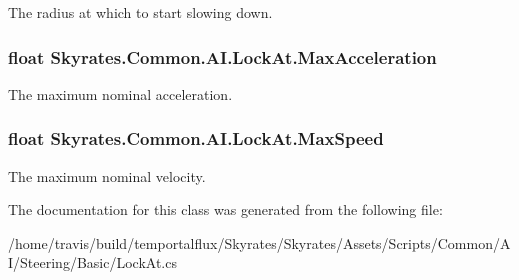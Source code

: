 The radius at which to start slowing down. 

\hypertarget{class_skyrates_1_1_common_1_1_a_i_1_1_lock_at_a9910cc8832b49ccb54957981785470be}{
\subsubsection[{Max\-Acceleration}]{\setlength{\rightskip}{0pt plus 5cm}float Skyrates.\-Common.\-A\-I.\-Lock\-At.\-Max\-Acceleration}}\label{class_skyrates_1_1_common_1_1_a_i_1_1_lock_at_a9910cc8832b49ccb54957981785470be}


The maximum nominal acceleration. 

\hypertarget{class_skyrates_1_1_common_1_1_a_i_1_1_lock_at_a625348f8b34e9103f2cd7a4de0a4d6b3}{
\subsubsection[{Max\-Speed}]{\setlength{\rightskip}{0pt plus 5cm}float Skyrates.\-Common.\-A\-I.\-Lock\-At.\-Max\-Speed}}\label{class_skyrates_1_1_common_1_1_a_i_1_1_lock_at_a625348f8b34e9103f2cd7a4de0a4d6b3}


The maximum nominal velocity. 



The documentation for this class was generated from the following file\-:\begin{DoxyCompactItemize}
\item 
/home/travis/build/temportalflux/\-Skyrates/\-Skyrates/\-Assets/\-Scripts/\-Common/\-A\-I/\-Steering/\-Basic/Lock\-At.\-cs\end{DoxyCompactItemize}
